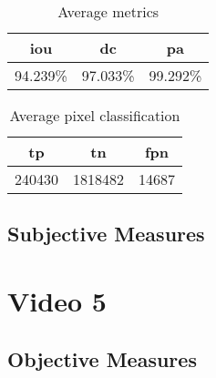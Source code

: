 \begin{minipage}[c]{0.475\textwidth}
\begin{table}[H]
    \centering
    \begin{tabular}{||c c c||} 
        \hline
        \acrshort{iou} & \acrshort{dc} & \acrshort{pa} \\ [0.5ex] 
        \hline\hline
        94.239\% & 97.033\% & 99.292\% \\ [1ex] 
        \hline
    \end{tabular}
    \caption{Average metrics}
    \label{tab:metrics_video_6}
\end{table}
\end{minipage}
\begin{minipage}[c]{0.475\textwidth}
\begin{table}[H]
    \centering
    \begin{tabular}{||c c c||} 
        \hline
        \acrshort{tp} & \acrshort{tn} & \acrshort{fpn} \\ [0.5ex] 
        \hline\hline
        240430 & 1818482 & 14687 \\ [1ex] 
        \hline
    \end{tabular}
    \caption{Average pixel classification}
    \label{tab:pixels_video_6}
\end{table}
\end{minipage}

\subsection{Subjective Measures}


\section{Video 5}
\subsection{Objective Measures}

